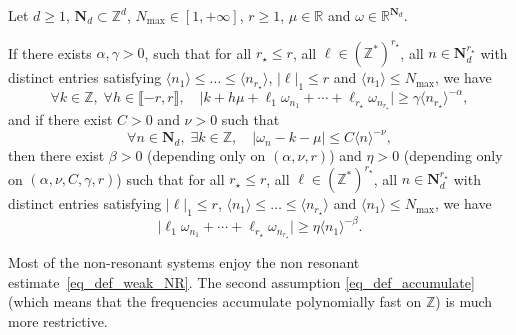 \begin{proposition} \label{prop_weak_become_strong} Let $d\geq 1$, $\mathbf{N}_d \subset \mathbb{Z}^d$, $N_{\max} \in [1,+\infty]$, $r\geq 1$, $\mu \in \mathbb{R}$ and $\omega \in \mathbb{R}^{\mathbf{N}_d}$.

If there exists $\alpha,\gamma>0$, such that for all $r_\star \leq r$, all $\ell \in (\mathbb{Z}^*)^{r_\star}$, all $n \in \mathbf{N}_d^{r_\star}$ with distinct entries satisfying $\langle n_1 \rangle \leq \dots \leq \langle n_{r_\star} \rangle$, $|\ell|_1 \leq r$ and $\langle n_1 \rangle \leq N_{\max}$, we have
\begin{equation}
\label{eq_def_weak_NR}
\forall k \in \mathbb{Z},\;\forall h\in \llbracket -r,r \rrbracket, \quad
\big| k + h\mu+\ell_1 \omega_{n_1}+\cdots +\ell_{r_\star} \omega_{n_{r_\star}} \big| \geq \gamma \langle n_{r_\star} \rangle^{-\alpha},
\end{equation}
and if there exist $C>0$ and $\nu >0$ such that
\begin{equation}
\label{eq_def_accumulate}
\forall n \in \mathbf{N}_d,\; \exists k \in \mathbb{Z}, \quad |\omega_n - k - \mu | \leq C \langle n \rangle^{-\nu},
\end{equation}
then there exist $\beta>0$ (depending only on $(\alpha,\nu,r)$) and $\eta >0$ (depending only on $(\alpha,\nu,C,\gamma,r)$) such that for all $r_\star \leq r$, all $\ell \in (\mathbb{Z}^*)^{r_\star}$, all $n \in \mathbf{N}_d^{r_\star}$ with distinct entries satisfying $|\ell|_1 \leq r$, $\langle n_1 \rangle \leq \dots \leq \langle n_{r_\star} \rangle$ and $\langle n_1 \rangle \leq N_{\max}$, we have
\begin{equation}
\label{eq_def_strong_NR}
\big| \ell_1 \omega_{n_1}+\cdots +\ell_{r_\star} \omega_{n_{r_\star}} \big| \geq \eta \langle n_{1} \rangle^{-\beta}.
\end{equation}
\end{proposition}
\begin{remark} Most of the non-resonant systems enjoy the non resonant estimate~\eqref{eq_def_weak_NR}. The second assumption \eqref{eq_def_accumulate} (which means that the frequencies accumulate polynomially fast on $ \mathbb{Z}$) is much more restrictive.
\end{remark}
